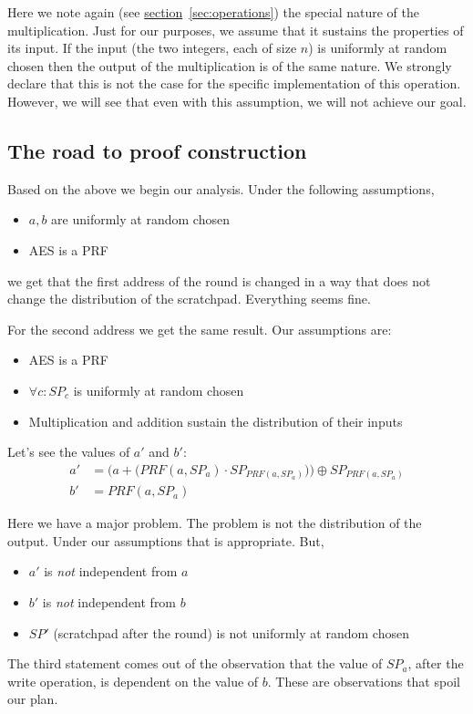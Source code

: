 Here we note again (see \hyperref[sec:operations]{section}~\ref{sec:operations}) the special nature of the multiplication. Just for our purposes, we assume that it sustains the properties of its input. If the input (the two integers, each of size $n$) is uniformly at random chosen then the output of the multiplication is of the same nature. We strongly declare that this is not the case for the specific implementation of this operation. However, we will see that even with this assumption, we will not achieve our goal.

\subsection{The road to proof construction}
Based on the above we begin our analysis. Under the following assumptions,
\begin{itemize}
  \item $a,b$ are uniformly at random chosen
  \item AES is a PRF
\end{itemize}
we get that the first address of the round is changed in a way that does not change the distribution of the scratchpad. Everything seems fine.

For the second address we get the same result. Our assumptions are:
\begin{itemize}
  \item AES is a PRF
  \item $\forall c : SP_c$ is uniformly at random chosen
  \item Multiplication and addition sustain the distribution of their inputs
\end{itemize}

Let's see the values of $a'$ and $b'$:
\begin{align} \label{eq:normal_1}
  a' &= \Big( a + \big( PRF(a, SP_{a}) \cdot SP_{PRF(a, SP_a)} \big) \Big) \oplus SP_{PRF(a, SP_a)}\\ b' &= PRF(a, SP_{a}) \label{eq:normal_2}
\end{align}

Here we have a major problem. The problem is not the distribution of the output. Under our assumptions that is appropriate. But,
\begin{itemize}
  \item $a'$ is \emph{not} independent from $a$
  \item $b'$ is \emph{not} independent from $b$
  \item $SP'$ (scratchpad after the round) is not uniformly at random chosen
\end{itemize}
The third statement comes out of the observation that the value of $SP_a$, after the write operation, is dependent on the value of $b$. These are observations that spoil our plan.

